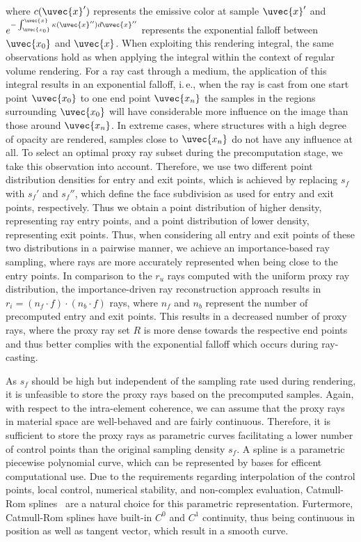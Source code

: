\documentclass[review,journal]{vgtc}         %
\begin{document}
\noindent where $c(\uvec{x}')$ represents the emissive color at sample $\uvec{x}'$ and $e^{-\int_{\uvec{x_0}}^{\uvec{x}}\kappa(\uvec{x}'')d\uvec{x}''}$ represents the exponential falloff between $\uvec{x_0}$ and $\uvec{x}$. When exploiting this rendering integral, the same observations hold as when applying the integral within the context of regular volume rendering. For a ray cast through a medium, the application of this integral results in an exponential falloff, i.\,e., when the ray is cast from one start point $\uvec{x_0}$ to one end point $\uvec{x_n}$ the samples in the regions surrounding $\uvec{x_0}$ will have considerable more influence on the image than those around $\uvec{x_n}$. In extreme cases, where structures with a high degree of opacity are rendered, samples close to $\uvec{x_n}$ do not have any influence at all. To select an optimal proxy ray subset during the precomputation stage, we take this observation into account. Therefore, we use two different point distribution densities for entry and exit points, which is achieved by replacing $s_f$ with $s_f'$ and $s_f''$, which define the face subdivision as used for entry and exit points, respectively. Thus we obtain a point distribution of higher density, representing ray entry points, and a point distribution of lower density, representing exit points. Thus, when considering all entry and exit points of these two distributions in a pairwise manner, we achieve an importance-based ray sampling, where rays are more accurately represented when being close to the entry points. In comparison to the $r_u$ rays computed with the uniform proxy ray distribution, the importance-driven ray reconstruction approach results in $r_i = (n_{f} \cdot f) \cdot (n_{b} \cdot f)$ rays, where $n_{f}$ and $n_{b}$ represent the number of precomputed entry and exit points. This results in a decreased number of proxy rays, where the proxy ray set $R$ is more dense towards the respective end points and thus better complies with the exponential falloff which occurs during ray-casting.

As $s_f$ should be high but independent of the sampling rate used during rendering, it is unfeasible to store the proxy rays based on the precomputed samples. Again, with respect to the intra-element coherence, we can assume that the proxy rays in material space are well-behaved and are fairly continuous. Therefore, it is sufficient to store the proxy rays as parametric curves facilitating a lower number of control points than the original sampling density $s_f$. A spline is a parametric piecewise polynomial curve, which can be represented by bases for efficent computational use. Due to the requirements regarding interpolation of the control points, local control, numerical stability, and non-complex evaluation, Catmull-Rom splines~\cite{catmull74splines} are a natural choice for this parametric representation. Furtermore, Catmull-Rom splines have built-in $C^{0}$ and $C^{1}$ continuity, thus being continuous in position as well as tangent vector, which result in a smooth curve.
\end{document}
